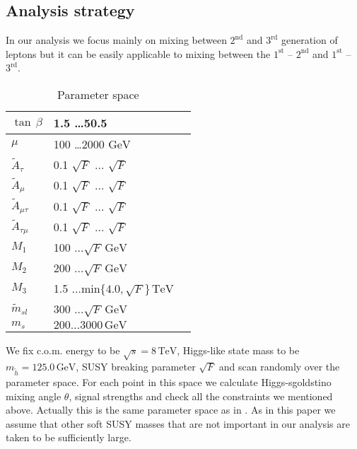 \documentclass[10pt]{article}
\begin{document}
\subsection{Analysis strategy}
In our analysis we focus mainly on mixing between $2^{\text{nd}}$ and $3^{\text{rd}}$ generation of leptons but it can be easily applicable to mixing between the $1^{\text{st}}$ -- $2^{\text{nd}}$ and $1^{\text{st}}$ -- $3^{\text{rd}}$.
\begin{table}[h!]
\begin{center}
\begin{tabular}{|M{1cm}|M{4cm}|N}
\hline
$\tan \, \beta$ & 1.5 \ldots 50.5 & \\[4pt] \hline
$\mu$ & 100 \ldots 2000 $\text{GeV}$ & \\[4pt] \hline
$\tilde{A}_{\tau}$ & 0.1 $\sqrt{F}$ $\ldots$ $\sqrt{F}$ & \\[4pt] \hline
$\tilde{A}_{\mu}$ & 0.1 $\sqrt{F}$ $\ldots$ $\sqrt{F}$ & \\[4pt] \hline
$\tilde{A}_{\mu \tau}$ & 0.1 $\sqrt{F}$ $\ldots$ $\sqrt{F}$ & \\[4pt] \hline
$\tilde{A}_{\tau \mu}$ & 0.1 $\sqrt{F}$ $\ldots$ $\sqrt{F}$ & \\[4pt] \hline
$M_1$ & 100 $ \ldots \sqrt{F} \, \text{GeV}$ & \\[4pt] \hline
$M_2$ & 200 $ \ldots \sqrt{F}\, \text{GeV}$ & \\[4pt] \hline
$M_3$ & 1.5  $\ldots\text{min}\{ 4.0,\sqrt{F}\} \, \text{TeV}$ & \\[4pt] \hline
$\tilde{m}_{sl}$ & 300 $\ldots \sqrt{F}\, \text{GeV}$ & \\[4pt] \hline
$m_s$ &  $200 \ldots 3000 \, \text{GeV}$ & \\[4pt] \hline 
\end{tabular}
\end{center}
\caption{Parameter space}
\label{tbl2}
\end{table}
We fix c.o.m. energy to be $\sqrt{s} = 8 \, \text{TeV}$, Higgs-like state mass to be $m_{\tilde{h}}=125.0 \, \text{GeV}$, SUSY breaking parameter $\sqrt{F}$ and scan randomly over the parameter space. For each point in this space we calculate Higgs-sgoldstino mixing angle $\theta$, signal strengths and check all the constraints we mentioned above. Actually this is the same parameter space as in \cite{DemAst}. As in this paper we assume that other soft SUSY masses that are not important in our analysis are taken to be sufficiently large.
\end{document}
